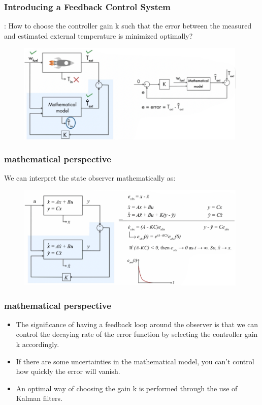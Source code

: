 \documentclass{beamer}
\begin{document}
\begin{frame}
	\frametitle{Introducing a Feedback Control System}
	{\color{red}{Question}}: How to choose the controller gain k such that the error between the measured and estimated external temperature is minimized optimally?
	\begin{figure}
		\centering
		\includegraphics[width=11cm]{observer.png}
	\end{figure}
 
\end{frame}

\begin{frame}
	\frametitle{mathematical perspective}
	We can interpret the state observer mathematically as:
	\begin{figure}
		\centering
		\includegraphics[width=11cm]{observer1.png}
	\end{figure}
\end{frame}

\begin{frame}
	\frametitle{mathematical perspective}
	\begin{itemize}
	    \item The significance of having a feedback loop around the observer is that we can control the decaying rate of the error function by selecting the controller gain k accordingly. 
	    
	    \item If there are some uncertainties in the mathematical model, you can't control how quickly the error will vanish.
	    
	    \item An optimal way of choosing the gain k is performed through the use of Kalman filters.
    \end{itemize}
\end{frame}
\end{document}
